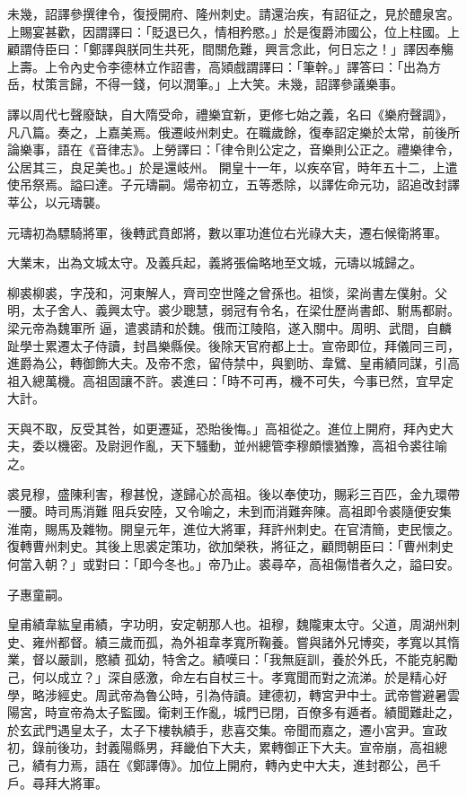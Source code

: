 \begin{pinyinscope}
 未幾，詔譯參撰律令，復授開府、隆州刺史。請還治疾，有詔征之，見於醴泉宮。
 上賜宴甚歡，因謂譯曰：「貶退已久，情相矜愍。」於是復爵沛國公，位上柱國。上顧謂侍臣曰：「鄭譯與朕同生共死，間關危難，興言念此，何日忘之！」譯因奉觴上壽。上令內史令李德林立作詔書，高熲戲謂譯曰：「筆幹。」譯答曰：「出為方岳，杖策言歸，不得一錢，何以潤筆。」上大笑。未幾，詔譯參議樂事。



 譯以周代七聲廢缺，自大隋受命，禮樂宜新，更修七始之義，名曰《樂府聲調》，凡八篇。奏之，上嘉美焉。俄遷岐州刺史。在職歲餘，復奉詔定樂於太常，前後所論樂事，語在《音律志》。上勞譯曰：「律令則公定之，音樂則公正之。禮樂律令，公居其三，良足美也。」於是還岐州。
 開皇十一年，以疾卒官，時年五十二，上遣使吊祭焉。謚曰達。子元璹嗣。煬帝初立，五等悉除，以譯佐命元功，詔追改封譯莘公，以元璹襲。



 元璹初為驃騎將軍，後轉武賁郎將，數以軍功進位右光祿大夫，遷右候衛將軍。



 大業末，出為文城太守。及義兵起，義將張倫略地至文城，元璹以城歸之。



 柳裘柳裘，字茂和，河東解人，齊司空世隆之曾孫也。祖惔，梁尚書左僕射。父明，太子舍人、義興太守。裘少聰慧，弱冠有令名，在梁仕歷尚書郎、駙馬都尉。梁元帝為魏軍所
 逼，遣裘請和於魏。俄而江陵陷，遂入關中。周明、武間，自麟趾學士累遷太子侍讀，封昌樂縣侯。後除天官府都上士。宣帝即位，拜儀同三司，進爵為公，轉御飾大夫。及帝不悆，留侍禁中，與劉昉、韋鷿、皇甫績同謀，引高祖入總萬機。高祖固讓不許。裘進曰：「時不可再，機不可失，今事已然，宜早定大計。



 天與不取，反受其咎，如更遷延，恐貽後悔。」高祖從之。進位上開府，拜內史大夫，委以機密。及尉迥作亂，天下騷動，並州總管李穆頗懷猶豫，高祖令裘往喻之。



 裘見穆，盛陳利害，穆甚悅，遂歸心於高祖。後以奉使功，賜彩三百匹，金九環帶一腰。時司馬消難
 阻兵安陸，又令喻之，未到而消難奔陳。高祖即令裘隨便安集淮南，賜馬及雜物。開皇元年，進位大將軍，拜許州刺史。在官清簡，吏民懷之。復轉曹州刺史。其後上思裘定策功，欲加榮秩，將征之，顧問朝臣曰：「曹州刺史何當入朝？」或對曰：「即今冬也。」帝乃止。裘尋卒，高祖傷惜者久之，謚曰安。



 子惠童嗣。



 皇甫績韋紘皇甫績，字功明，安定朝那人也。祖穆，魏隴東太守。父道，周湖州刺史、雍州都督。績三歲而孤，為外祖韋孝寬所鞠養。嘗與諸外兄博奕，孝寬以其惰業，督以嚴訓，愍績
 孤幼，特舍之。績嘆曰：「我無庭訓，養於外氏，不能克躬勵己，何以成立？」深自感激，命左右自杖三十。孝寬聞而對之流涕。於是精心好學，略涉經史。周武帝為魯公時，引為侍讀。建德初，轉宮尹中士。武帝嘗避暑雲陽宮，時宣帝為太子監國。衛剌王作亂，城門已閉，百僚多有遁者。績聞難赴之，於玄武門遇皇太子，太子下樓執績手，悲喜交集。帝聞而嘉之，遷小宮尹。宣政初，錄前後功，封義陽縣男，拜畿伯下大夫，累轉御正下大夫。宣帝崩，高祖總己，績有力焉，語在《鄭譯傳》。加位上開府，轉內史中大夫，進封郡公，邑千戶。尋拜大將軍。




\end{pinyinscope}
